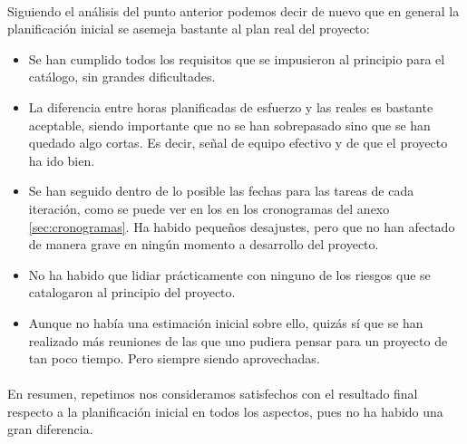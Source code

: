 \paragraph{}Siguiendo el análisis del punto anterior podemos decir de nuevo que en general la planificación inicial se asemeja bastante al plan real del proyecto:

\begin{itemize}
	\item Se han cumplido todos los requisitos que se impusieron al principio para el catálogo, sin grandes dificultades.
	
	\item La diferencia entre horas planificadas de esfuerzo y las reales es bastante aceptable, siendo importante que no se han sobrepasado sino que se han quedado algo cortas. Es decir, señal de equipo efectivo y de que el proyecto ha ido bien.
	
	\item Se han seguido dentro de lo posible las fechas para las tareas de cada iteración, como se puede ver en los en los cronogramas del anexo \ref{sec:cronogramas}. Ha habido pequeños desajustes, pero que no han afectado de manera grave en ningún momento a desarrollo del proyecto.
	
	\item No ha habido que lidiar prácticamente con ninguno de los riesgos que se catalogaron al principio del proyecto.
	
	\item Aunque no había una estimación inicial sobre ello, quizás sí que se han realizado más reuniones de las que uno pudiera pensar para un proyecto de tan poco tiempo. Pero siempre siendo aprovechadas.
\end{itemize}

\paragraph{}En resumen, repetimos nos consideramos satisfechos con el resultado final respecto a la planificación inicial en todos los aspectos, pues no ha habido una gran diferencia.
